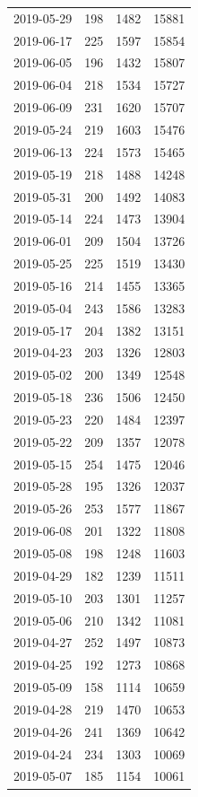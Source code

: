 \begin{tabular}{lrrr}
2019-05-29 & 198 & 1482 & 15881 \\
2019-06-17 & 225 & 1597 & 15854 \\
2019-06-05 & 196 & 1432 & 15807 \\
2019-06-04 & 218 & 1534 & 15727 \\
2019-06-09 & 231 & 1620 & 15707 \\
2019-05-24 & 219 & 1603 & 15476 \\
2019-06-13 & 224 & 1573 & 15465 \\
2019-05-19 & 218 & 1488 & 14248 \\
2019-05-31 & 200 & 1492 & 14083 \\
2019-05-14 & 224 & 1473 & 13904 \\
2019-06-01 & 209 & 1504 & 13726 \\
2019-05-25 & 225 & 1519 & 13430 \\
2019-05-16 & 214 & 1455 & 13365 \\
2019-05-04 & 243 & 1586 & 13283 \\
2019-05-17 & 204 & 1382 & 13151 \\
2019-04-23 & 203 & 1326 & 12803 \\
2019-05-02 & 200 & 1349 & 12548 \\
2019-05-18 & 236 & 1506 & 12450 \\
2019-05-23 & 220 & 1484 & 12397 \\
2019-05-22 & 209 & 1357 & 12078 \\
2019-05-15 & 254 & 1475 & 12046 \\
2019-05-28 & 195 & 1326 & 12037 \\
2019-05-26 & 253 & 1577 & 11867 \\
2019-06-08 & 201 & 1322 & 11808 \\
2019-05-08 & 198 & 1248 & 11603 \\
2019-04-29 & 182 & 1239 & 11511 \\
2019-05-10 & 203 & 1301 & 11257 \\
2019-05-06 & 210 & 1342 & 11081 \\
2019-04-27 & 252 & 1497 & 10873 \\
2019-04-25 & 192 & 1273 & 10868 \\
2019-05-09 & 158 & 1114 & 10659 \\
2019-04-28 & 219 & 1470 & 10653 \\
2019-04-26 & 241 & 1369 & 10642 \\
2019-04-24 & 234 & 1303 & 10069 \\
2019-05-07 & 185 & 1154 & 10061 \\

\end{tabular}
